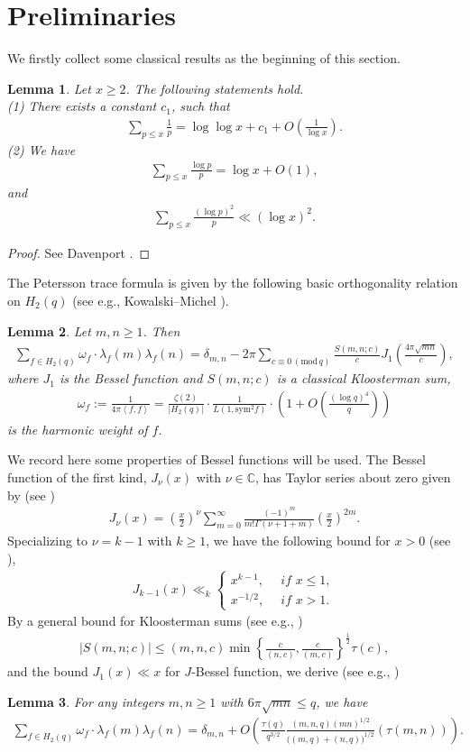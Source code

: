 \documentclass[11pt,reqno]{amsart}
\newcommand{\bea}{\begin{eqnarray}}
\newcommand{\eea}{\end{eqnarray}}
\newcommand{\bna}{\begin{eqnarray*}}
\newcommand{\ena}{\end{eqnarray*}}
\numberwithin{equation}{section}
\theoremstyle{plain}
\newtheorem{lemma}{Lemma}[section]
\theoremstyle{definition}
\renewcommand{\bmod}[1]{\,(\mathrm{mod\,}{#1})}
\begin{document}
\section{Preliminaries}
\label{prelim}
We firstly collect some classical results as the beginning of this section.
\begin{lemma} Let $x\geq 2$. The following statements hold.\\
(1) There exists a constant $c_1$, such that
\bea\label{classical bound 1}
\sum_{p\leq x}\frac{1}{p}=\log\log x+c_1+O\left(\frac{1}{\log x}\right).
\eea
(2) We have
\bna\label{classical bound 3}
\sum_{p\leq x}\frac{\log p}{p}=\log x+O(1),
\ena
and
\bna\label{classical bound 2}
\sum_{p\leq x}\frac{(\log p)^2}{p}\ll (\log x)^2.
\ena
\end{lemma}
\begin{proof}
See Davenport \cite[pp.\,56--57]{Davenport}.
\end{proof}
The Petersson trace formula is given by the following basic orthogonality relation on $H_2(q)$
(see e.g., Kowalski--Michel \cite{KM}).
\begin{lemma}\label{Petersson trace formula}
Let $m,n\geq 1$. Then
\bna
\sum_{f\in H_2(q)}\omega_f\cdot\lambda_f(m)\lambda_f(n)=\delta_{m,n}-
2\pi \sum_{c\equiv 0\bmod q}\frac{S(m,n;c)}{c}J_1\left(\frac{4\pi\sqrt{mn}}{c}\right),
\ena
where $J_1$ is the Bessel function and $S(m,n;c)$ is a classical Kloosterman sum,
\bea\label{the harmonic weight}
\omega_f:=\frac{1}{4\pi \left<f,f\right>}=\frac{\zeta(2)}{|H_2(q)|}\cdot
\frac{1}{L(1,\mathrm{sym}^2f)}\cdot\left(1+O\left(\frac{(\log q)^4}{q}\right)\right)
\eea
is the harmonic weight of $f$.
\end{lemma}

We record here some properties of Bessel functions will be used. The Bessel function
of the first kind, $J_\nu(x)$ with $\nu\in\mathbb{C}$, has Taylor series about zero given by (see \cite[pg. 918, Eq. 8.440]{GR})
\bna
J_\nu(x)=\left(\frac{x}{2}\right)^\nu\sum_{m=0}^\infty\frac{(-1)^m}{m!\Gamma(\nu+1+m)}\left(\frac{x}{2}\right)^{2m}.
\ena
Specializing to $\nu=k-1$ with $k\geq 1$,
we have the following bound for $x>0$ (see \cite[Sections 2.11, 7.1]{Watson}),
\bna\label{J_k bound}
J_{k-1}(x)\ll_k
\begin{cases}
x^{k-1}, \,&\textit{ if } x\leq1,\\
x^{-1/2}, \,&\textit{ if } x>1.
\end{cases}
\ena
By a general bound for Kloosterman sums (see e.g., \cite[(2.13)]{ILS})
\bna
|S(m,n;c)|\leq (m,n,c)\min\left\{\frac{c}{(n,c)},\frac{c}{(m,c)}\right\}^{\frac{1}{2}}\tau(c),
\ena
and the bound $J_1(x)\ll x$ for $J$-Bessel function, we derive (see e.g., \cite[Corollary 2.3]{ILS})
\begin{lemma}\label{corollary}
For any integers $m,n\geq 1$ with $6\pi\sqrt{mn}\leq q$, we have
\bna
\sum_{f\in H_2(q)}\omega_f\cdot\lambda_f(m)\lambda_f(n)=\delta_{m,n}
+O\left(\frac{\tau(q)}{q^{3/2}}\frac{(m,n,q)(mn)^{1/2}}{\big((m,q)+(n,q)\big)^{1/2}}(\tau (m,n))\right).
\ena
\end{lemma}
\end{document}
